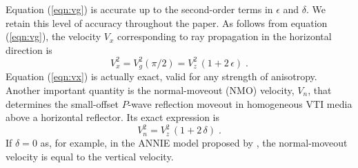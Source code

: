 \par
Equation (\ref{eqn:vg}) is accurate up to the second-order terms in
$\epsilon$ and $\delta$. We retain this level of accuracy throughout
the paper. As follows from equation
(\ref{eqn:vg}), the velocity $V_x$ corresponding to ray
propagation in the horizontal direction is
\begin{equation}
V_x^2 = V_g^2(\pi/2) = V_z^2\,(1 + 2\,\epsilon)\;.
\label{eqn:vx}
\end{equation}
Equation (\ref{eqn:vx}) is actually exact, valid
for any strength of anisotropy.  Another important quantity is the
normal-moveout (NMO) velocity, $V_n$, that determines the small-offset 
$P$-wave reflection moveout in homogeneous VTI media above a
horizontal reflector. Its exact expression is \cite[]{GEO51-10-19541966}
\begin{equation}
V_n^2 = V_z^2\,(1 + 2\,\delta)\;.
\label{eqn:vn}
\end{equation}
If $\delta = 0$ as, for example, in the ANNIE model proposed by
\cite{annie}, the normal-moveout velocity 
is equal to the vertical velocity.

